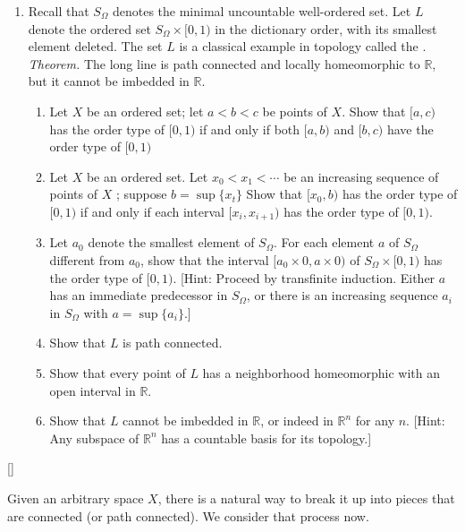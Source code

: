 \begin{enumerate}[itemsep=0.4em, parsep=0pt, topsep=0pt, partopsep=0pt, leftmargin=*, label=\arabic*., ref=\arabic*]
\item[*12.] Recall that \(S_{\Omega }\) denotes the minimal uncountable well-ordered set. Let \(L\) denote the ordered set \(S_{\Omega } \times \lbrack 0,1)\) in the dictionary order, with its smallest element deleted. The set \(L\) is a classical example in topology called the . \textsl{Theorem.} The long line is path connected and locally homeomorphic to \(\mathbb{R}\), but it cannot be imbedded in \(\mathbb{R}\).
 \begin{enumerate}[itemsep=0.2em, parsep=0pt, topsep=0pt, partopsep=0pt, leftmargin=*, label=(\alph*), align=left]
 \item Let \(X\) be an ordered set; let \(a < b < c\) be points of \(X\). Show that \(\lbrack a,c)\) has the order type of \(\lbrack 0,1)\) if and only if both \(\lbrack a,b)\) and \(\lbrack b,c)\) have the order type of \(\lbrack 0,1)\)
 \item Let \(X\) be an ordered set. Let \(x_{0} < x_{1} < \cdots\) be an increasing sequence of points of \(X\) ; suppose \(b = \sup \{ x_{t}\}\) Show that \([ {x_{0},b})\) has the order type of \(\lbrack 0,1)\) if and only if each interval \([ {x_{i},x_{i + 1}})\) has the order type of \(\lbrack 0,1)\).
 \item Let \(a_{0}\) denote the smallest element of \(S_{\Omega }\). For each element \(a\) of \(S_{\Omega }\) different from \(a_{0}\), show that the interval \([ {a_{0} \times 0,a \times 0})\) of \(S_{\Omega } \times \lbrack 0,1)\) has the order type of \(\lbrack 0,1)\). [Hint: Proceed by transfinite induction. Either \(a\) has an immediate predecessor in \(S_{\Omega }\), or there is an increasing sequence \(a_{i}\) in \(S_{\Omega }\) with \(a = \sup \{ a_{i}\}\).]
 \item Show that \(L\) is path connected.
 \item Show that every point of \(L\) has a neighborhood homeomorphic with an open interval in \(\mathbb{R}\).
 \item Show that \(L\) cannot be imbedded in \(\mathbb{R}\), or indeed in \(\mathbb{R}^{n}\) for any \(n\). [Hint: Any subspace of \(\mathbb{R}^{n}\) has a countable basis for its topology.]
 \end{enumerate}
\end{enumerate}
[\protect\sectionDagger]

Given an arbitrary space \(X\), there is a natural way to break it up into pieces that are connected (or path connected). We consider that process now.


